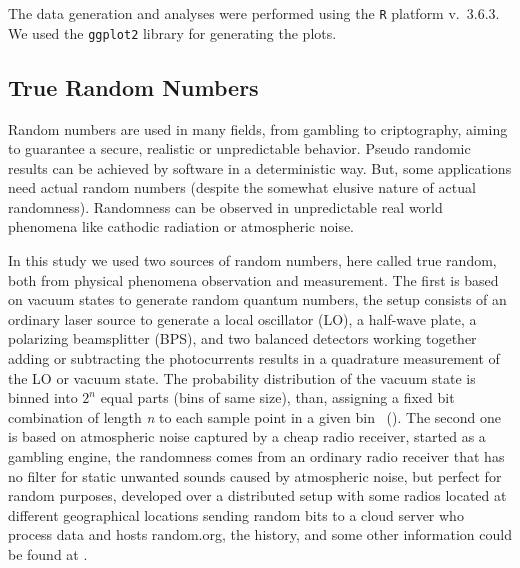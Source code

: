 The data generation and analyses were performed using the \texttt R platform \cite{Rmanual} v.~3.6.3.
We used the \texttt{ggplot2} library \cite{ggplot2Wickman} for generating the plots.

\subsection{True Random Numbers}

Random numbers are used in many fields, from gambling to criptography, aiming to guarantee a secure, realistic or unpredictable behavior. 
Pseudo randomic results can be achieved by software in a deterministic way. 
But, some applications need actual random numbers (despite the somewhat elusive nature of actual randomness).
Randomness can be observed in unpredictable real world phenomena like cathodic radiation or atmospheric noise.

In this study we used two sources of random numbers, here called true random, both from physical phenomena observation and measurement.
The first is based on vacuum states to generate random quantum numbers, the setup consists of an ordinary laser source to generate a local oscillator (LO), a half-wave plate, a polarizing beamsplitter (BPS), and two balanced detectors working together adding or subtracting the photocurrents results in a quadrature measurement of the LO or vacuum state. 
The probability distribution of the vacuum state is binned into $2^n$ equal parts (bins of same size), than, assigning a fixed bit combination of length \textit{n} to each sample point in a given bin \citeauthor{RNGVacuumStates}~(\citeyear{RNGVacuumStates}). 
The second one is based on atmospheric noise captured by a cheap radio receiver, started as a gambling engine, the randomness comes from an ordinary radio receiver that has no filter for static unwanted sounds caused by atmospheric noise, but perfect for random purposes, developed over a distributed setup with some radios located at different geographical locations sending random bits to a cloud server who process data and hosts random.org, the history, and some other information could be found at \cite{RandomOrg}.



